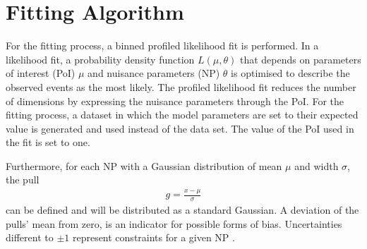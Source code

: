 \documentclass[bachelor,oneside, BCOR10mm,
			ngerman,english  %
]{GAUBM}
\begin{document}

\section{Fitting Algorithm}
\label{sec:FittingAlgorithm}
For the fitting process, a binned profiled likelihood fit \cite{fitting_profilelikelihood01} is performed. In a likelihood fit, a probability density function $L(\mu,\theta)$ that depends on parameters of interest (PoI) $\mu$ and nuisance parameters (NP) $\theta$ is optimised to describe the observed events as the most likely. The profiled likelihood fit reduces the number of dimensions by expressing the nuisance parameters through the PoI. For the fitting process, a dataset in which the model parameters are set to their expected value is generated and used instead of the data set. The value of the PoI used in the fit is set to one. 

Furthermore, for each NP with a Gaussian distribution of mean $\mu$ and width $\sigma$, the pull 
\begin{align*}
	g = \frac{x-\mu}{\sigma}
\end{align*}
can be defined and will be distributed as a standard Gaussian. A deviation of the pulls' mean from zero, is an indicator for possible forms of bias. Uncertainties different to $\pm1$ represent constraints for a given NP \cite{fitting_pullplots}.
\end{document}
